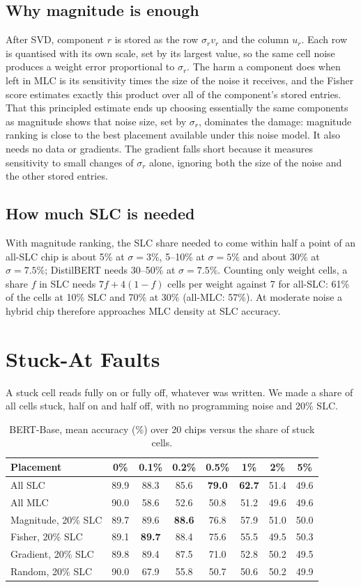 \documentclass[10pt,a4paper]{article}
\newcommand{\best}[1]{\textcolor{cmag}{\textbf{#1}}}
\begin{document}
\subsection{Why magnitude is enough}
After SVD, component $r$ is stored as the row $\sigma_r v_r$ and the column $u_r$. Each row is quantised
with its own scale, set by its largest value, so the same cell noise produces a weight error proportional
to $\sigma_r$. The harm a component does when left in MLC is its sensitivity times the size of the noise
it receives, and the Fisher score estimates exactly this product over all of the component's stored
entries. That this principled estimate ends up choosing essentially the same components as magnitude
shows that noise size, set by $\sigma_r$, dominates the damage: magnitude ranking is close to the best
placement available under this noise model. It also needs no data or gradients. The gradient falls short
because it measures sensitivity to small changes of $\sigma_r$ alone, ignoring both the size of the noise
and the other stored entries.

\subsection{How much SLC is needed}
With magnitude ranking, the SLC share needed to come within half a point of an all-SLC chip is about 5\%
at $\sigma=3\%$, 5--10\% at $\sigma=5\%$ and about 30\% at $\sigma=7.5\%$; DistilBERT needs 30--50\% at
$\sigma=7.5\%$. Counting only weight cells, a share $f$ in SLC needs $7f+4(1-f)$ cells per weight against 7
for all-SLC: 61\% of the cells at 10\% SLC and 70\% at 30\% (all-MLC: 57\%). At moderate noise a hybrid
chip therefore approaches MLC density at SLC accuracy.

\section{Stuck-At Faults}
A stuck cell reads fully on or fully off, whatever was written. We made a share of all cells stuck, half
on and half off, with no programming noise and 20\% SLC.

\begin{table}[h]
\centering\small
\begin{tabular}{@{}lccccccc@{}}
\toprule
Placement & 0\% & 0.1\% & 0.2\% & 0.5\% & 1\% & 2\% & 5\% \\
\midrule
All SLC & 89.9 & 88.3 & 85.6 & \best{79.0} & \best{62.7} & 51.4 & 49.6 \\
All MLC & 90.0 & 58.6 & 52.6 & 50.8 & 51.2 & 49.6 & 49.6 \\
\midrule
Magnitude, 20\% SLC & 89.7 & 89.6 & \best{88.6} & 76.8 & 57.9 & 51.0 & 50.0 \\
Fisher, 20\% SLC    & 89.1 & \best{89.7} & 88.4 & 75.6 & 55.5 & 49.5 & 50.3 \\
Gradient, 20\% SLC  & 89.8 & 89.4 & 87.5 & 71.0 & 52.8 & 50.2 & 49.5 \\
Random, 20\% SLC    & 90.0 & 67.9 & 55.8 & 50.7 & 50.6 & 50.2 & 49.9 \\
\bottomrule
\end{tabular}
\caption{BERT-Base, mean accuracy (\%) over 20 chips versus the share of stuck cells.}
\end{table}
\end{document}
